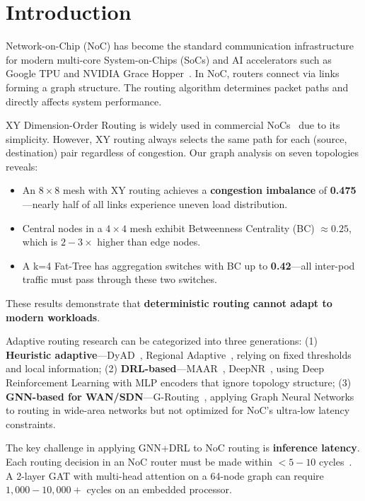 \documentclass[conference]{IEEEtran}
\begin{document}
\section{Introduction}
\label{sec:intro}

Network-on-Chip (NoC) has become the standard communication infrastructure for modern multi-core System-on-Chips (SoCs) and AI accelerators such as Google TPU and NVIDIA Grace Hopper~\cite{mirhoseini2021}. In NoC, routers connect via links forming a graph structure. The routing algorithm determines packet paths and directly affects system performance.

XY Dimension-Order Routing is widely used in commercial NoCs~\cite{wang2022maar} due to its simplicity. However, XY routing always selects the same path for each (source, destination) pair regardless of congestion. Our graph analysis on seven topologies reveals:

\begin{itemize}
 \item An $8\times8$ mesh with XY routing achieves a \textbf{congestion imbalance} of \textbf{0.475}---nearly half of all links experience uneven load distribution.
 \item Central nodes in a $4\times4$ mesh exhibit Betweenness Centrality (BC) $\approx 0.25$, which is $2-3\times$ higher than edge nodes.
 \item A k=4 Fat-Tree has aggregation switches with BC up to \textbf{0.42}---all inter-pod traffic must pass through these two switches.
\end{itemize}

These results demonstrate that \textbf{deterministic routing cannot adapt to modern workloads}.

Adaptive routing research can be categorized into three generations: (1) \textbf{Heuristic adaptive}---DyAD~\cite{dyad2004}, Regional Adaptive~\cite{ebrahimi2019}, relying on fixed thresholds and local information; (2) \textbf{DRL-based}---MAAR~\cite{wang2022maar}, DeepNR~\cite{deepnr2022}, using Deep Reinforcement Learning with MLP encoders that ignore topology structure; (3) \textbf{GNN-based for WAN/SDN}---G-Routing~\cite{g-routing2023}, applying Graph Neural Networks to routing in wide-area networks but not optimized for NoC's ultra-low latency constraints.

The key challenge in applying GNN+DRL to NoC routing is \textbf{inference latency}. Each routing decision in an NoC router must be made within $<5-10$ cycles~\cite{wang2022maar}. A 2-layer GAT with multi-head attention on a 64-node graph can require $1{,}000-10{,}000+$ cycles on an embedded processor.
\end{document}
